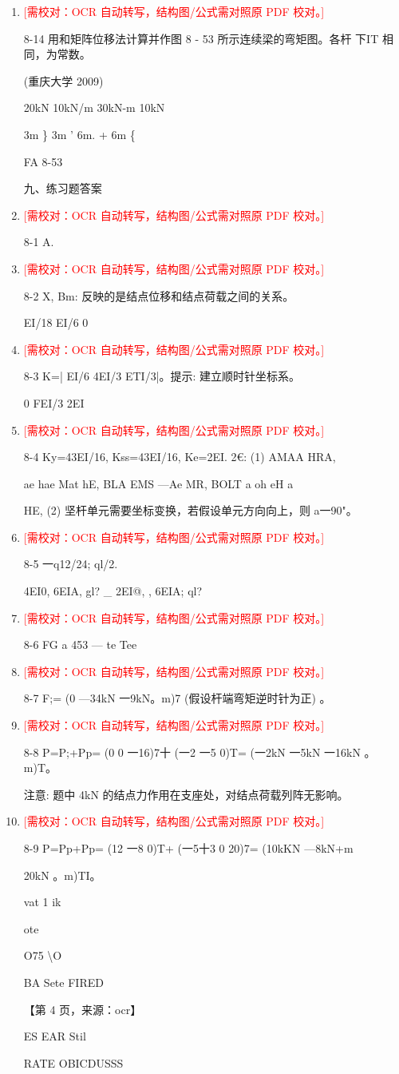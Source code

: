 \documentclass[UTF8,12pt,a4paper,openany]{ctexbook}
\newcommand{\TODO}[1]{\textcolor{red}{[需校对：#1]}}
\begin{document}
\begin{enumerate}[label=\textbf{\arabic*.},leftmargin=2em]
\item \TODO{OCR 自动转写，结构图/公式需对照原 PDF 校对。}\par 8-14 用和矩阵位移法计算并作图 8 - 53 所示连续梁的弯矩图。各杆 下IT 相同，为常数。\par (重庆大学 2009)\par 20kN       10kN/m    30kN-m       10kN\par 3m  \}  3m  '     6m.    +    6m    \{\par FA 8-53\par 九、练习题答案
\item \TODO{OCR 自动转写，结构图/公式需对照原 PDF 校对。}\par 8-1 A.
\item \TODO{OCR 自动转写，结构图/公式需对照原 PDF 校对。}\par 8-2 X, Bm: 反映的是结点位移和结点荷载之间的关系。\par EI/18 EI/6 0
\item \TODO{OCR 自动转写，结构图/公式需对照原 PDF 校对。}\par 8-3 K=| EI/6 4EI/3 ETI/3|。提示: 建立顺时针坐标系。\par 0 FEI/3 2EI
\item \TODO{OCR 自动转写，结构图/公式需对照原 PDF 校对。}\par 8-4 Ky=43EI/16, Kss=43EI/16, Ke=2EI. 2€: (1) AMAA HRA,\par ae hae Mat hE, BLA EMS —Ae MR, BOLT a oh eH a\par HE, (2) 坚杆单元需要坐标变换，若假设单元方向向上，则 a一90"。
\item \TODO{OCR 自动转写，结构图/公式需对照原 PDF 校对。}\par 8-5 一q12/24; ql/2.\par 4EI0, 6EIA, gl? \_ 2EI@, , 6EIA; ql?
\item \TODO{OCR 自动转写，结构图/公式需对照原 PDF 校对。}\par 8-6 FG    a 453 — te Tee
\item \TODO{OCR 自动转写，结构图/公式需对照原 PDF 校对。}\par 8-7 F;= (0 —34kN 一9kN。m)7 (假设杆端弯矩逆时针为正) 。
\item \TODO{OCR 自动转写，结构图/公式需对照原 PDF 校对。}\par 8-8 P=P;+Pp= (0 0 一16)7十 (一2 一5 0)T= (一2kN 一5kN 一16kN 。m)T。\par 注意: 题中 4kN 的结点力作用在支座处，对结点荷载列阵无影响。
\item \TODO{OCR 自动转写，结构图/公式需对照原 PDF 校对。}\par 8-9 P=Pp+Pp= (12 一8 0)T+ (一5十3 0 20)7= (10kKN —8kN+m\par 20kN 。m)TI。\par vat 1 ik\par ote\par O75 \textbackslash{}O\par BA Sete FIRED\par \par 【第 4 页，来源：ocr】\par ES EAR Stil\par RATE OBICDUSSS

\end{enumerate}
\end{document}
